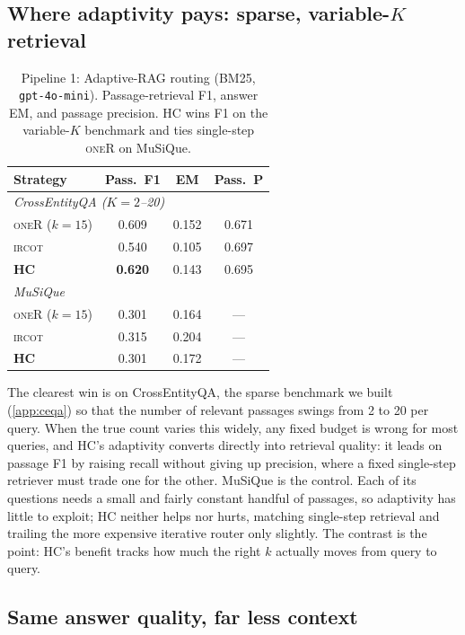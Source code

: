 \documentclass[letterpaper]{article}
\newcommand{\CEqaFHC}{0.620}\newcommand{\CEqaFoner}{0.609}\newcommand{\CEqaFircot}{0.540}
\newcommand{\MusFHC}{0.301}\newcommand{\MusFoner}{0.301}\newcommand{\MusFircot}{0.315}
\begin{document}
\subsection{Where adaptivity pays: sparse, variable-$K$ retrieval}

\begin{table}[t]
\centering\small
\setlength{\extrarowheight}{1.5pt}
\begin{tabular}{|l|c|c|c|}
\hline
\textbf{Strategy} & \textbf{Pass.\ F1} & \textbf{EM} & \textbf{Pass.\ P} \\
\hline
\multicolumn{4}{|l|}{\emph{CrossEntityQA ($K{=}2$--20)}}\\
\hline
\textsc{oneR} ($k{=}15$) & \CEqaFoner & 0.152 & 0.671 \\
\hline
\textsc{ircot} & \CEqaFircot & 0.105 & 0.697 \\
\hline
\textbf{HC} & \textbf{\CEqaFHC} & 0.143 & 0.695 \\
\hline
\multicolumn{4}{|l|}{\emph{MuSiQue}}\\
\hline
\textsc{oneR} ($k{=}15$) & \MusFoner & 0.164 & --- \\
\hline
\textsc{ircot} & \MusFircot & 0.204 & --- \\
\hline
\textbf{HC} & \MusFHC & 0.172 & --- \\
\hline
\end{tabular}
\caption{Pipeline 1: Adaptive-RAG routing (BM25, \texttt{gpt-4o-mini}).
Passage-retrieval F1, answer EM, and passage precision. HC wins F1 on the
variable-$K$ benchmark and ties single-step \textsc{oneR} on MuSiQue.}
\label{tab:p1a}
\end{table}

The clearest win is on CrossEntityQA, the sparse benchmark we built
(\ref{app:ceqa}) so
that the number of relevant passages swings from 2 to 20 per query. When
the true count varies this widely, any fixed budget is wrong for most
queries, and HC's adaptivity converts directly into retrieval quality: it
leads on passage F1 by raising recall without giving up precision, where
a fixed single-step retriever must trade one for the other. MuSiQue is
the control. Each of its questions needs a small and fairly constant
handful of passages, so adaptivity has little to exploit; HC neither
helps nor hurts, matching single-step retrieval and trailing the more
expensive iterative router only slightly. The contrast is the point:
HC's benefit tracks how much the right $k$ actually moves from query to
query.

\subsection{Same answer quality, far less context}
\end{document}
